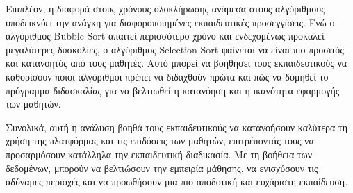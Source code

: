 Επιπλέον, η διαφορά στους χρόνους ολοκλήρωσης ανάμεσα στους αλγόριθμους υποδεικνύει την ανάγκη για διαφοροποιημένες εκπαιδευτικές προσεγγίσεις. Ενώ ο αλγόριθμος Bubble Sort απαιτεί περισσότερο χρόνο και ενδεχομένως προκαλεί μεγαλύτερες δυσκολίες, ο αλγόριθμος Selection Sort φαίνεται να είναι πιο προσιτός και κατανοητός από τους μαθητές. Αυτό μπορεί να βοηθήσει τους εκπαιδευτικούς να καθορίσουν ποιοι αλγόριθμοι πρέπει να διδαχθούν πρώτα και πώς να δομηθεί το πρόγραμμα διδασκαλίας για να βελτιωθεί η κατανόηση και η ικανότητα εφαρμογής των μαθητών.

Συνολικά, αυτή η ανάλυση βοηθά τους εκπαιδευτικούς να κατανοήσουν καλύτερα τη χρήση της πλατφόρμας και τις επιδόσεις των μαθητών, επιτρέποντάς τους να προσαρμόσουν κατάλληλα την εκπαιδευτική διαδικασία. Με τη βοήθεια των δεδομένων, μπορούν να βελτιώσουν την εμπειρία μάθησης, να ενισχύσουν τις αδύναμες περιοχές και να προωθήσουν μια πιο αποδοτική και ευχάριστη εκπαίδευση.
